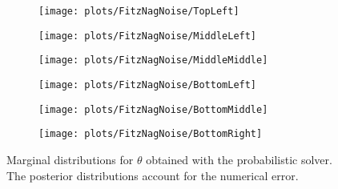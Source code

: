 \begin{figure}[t]
	\centering
	\begin{subfigure}{0.33\linewidth}
		\texttt{[image: plots/FitzNagNoise/TopLeft]}
	\end{subfigure}
	\hspace*{.66\textwidth}\quad
	
	\begin{subfigure}{0.32\linewidth}
		\texttt{[image: plots/FitzNagNoise/MiddleLeft]}
	\end{subfigure}
	\begin{subfigure}{0.32\linewidth}
		\texttt{[image: plots/FitzNagNoise/MiddleMiddle]}
	\end{subfigure}
	\hspace*{.33\textwidth}\quad
	
	\begin{subfigure}{0.32\linewidth}
		\texttt{[image: plots/FitzNagNoise/BottomLeft]}
	\end{subfigure}
	\begin{subfigure}{0.32\linewidth}
		\texttt{[image: plots/FitzNagNoise/BottomMiddle]}
	\end{subfigure}
	\begin{subfigure}{0.32\linewidth}
		\texttt{[image: plots/FitzNagNoise/BottomRight]}
	\end{subfigure}
	\caption{Marginal distributions for $\theta$ obtained with the probabilistic solver. The posterior distributions account for the numerical error.}
	\label{fig:FitzNagProb}
\end{figure}